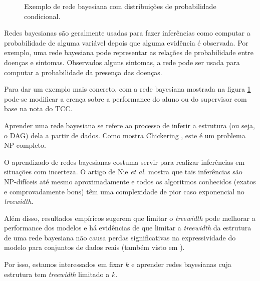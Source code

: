 \begin{figure}

  \caption{Exemplo de rede bayesiana com distribuições de probabilidade condicional.}
  \label{fig:bayes}
\end{figure}

Redes bayesianas são geralmente usadas para fazer inferências como computar a probabilidade de alguma variável depois que alguma evidência é observada. Por exemplo, uma rede bayesiana pode representar as relações de probabilidade entre doenças e sintomas. Observados alguns sintomas, a rede pode ser usada para computar a probabilidade da presença das doenças.

Para dar um exemplo mais concreto, com a rede bayesiana mostrada na figura \ref{fig:bayes} pode-se modificar a crença sobre a performance do aluno ou do supervisor com base na nota do TCC.

\vspace{2em}

Aprender uma rede bayesiana se refere ao processo de inferir a estrutura (ou seja, o DAG) dela a partir de dados. Como mostra Chickering \cite{chickering}, este é um problema NP-completo.

O aprendizado de redes bayesianas costuma servir para realizar inferências em situações com incerteza. O artigo de Nie \emph{et al.} \cite{maua} mostra que tais inferências são NP-difíceis até mesmo aproximadamente e todos os algoritmos conhecidos (exatos e comprovadamente bons) têm uma complexidade de pior caso exponencial no \emph{treewidth}.

Além disso, resultados empíricos sugerem que limitar o \emph{treewidth} pode melhorar a performance dos modelos e há evidências de que limitar a \emph{treewidth} da estrutura de uma rede bayesiana não causa perdas significativas na expressividade do modelo para conjuntos de dados reais (também visto em \cite{maua}).

Por isso, estamos interessados em fixar $k$ e aprender redes bayesianas cuja estrutura tem \emph{treewidth} limitado a $k$.

